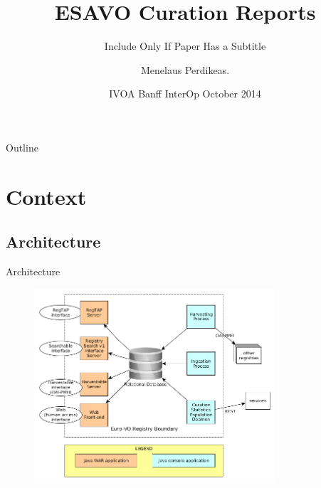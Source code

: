 \documentclass{beamer}
\title[ESAVO Curation Reports] %
{ESAVO Curation Reports}
\subtitle
{Include Only If Paper Has a Subtitle}
\author[Menelaus Perdikeas] %
{Menelaus Perdikeas\inst{1}.}
\institute[ESAC | Neuropublic SA] %
{
  \inst{1}%
  ESAC
}
\date[CFP 2003] %
{IVOA Banff InterOp October 2014}
\begin{document}
\begin{frame}
  \titlepage
\end{frame}

\begin{frame}{Outline}
  \tableofcontents
\end{frame}





\section{Context}

\subsection{Architecture}
\begin{frame}{Architecture}

\begin{figure}[htbp]
    \centering
    \includegraphics[width=0.8\textwidth]{high-level-design-02.png}
\end{figure}

\end{frame}
\end{document}
